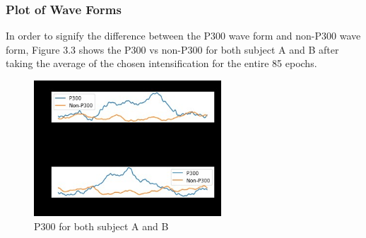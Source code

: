 \subsubsection{Plot of Wave Forms}
In order to signify the difference between the P300 wave form and non-P300 wave form, Figure 3.3 shows the P300 vs non-P300  for both subject A and B after taking the average of the chosen intensification for the entire 85 epochs.
\begin{figure}
    \centering
    \includegraphics[width=70mm]{images/A-B-P300-plot.jpg}
    \caption{P300 for both subject A and B}
    \label{fig:my_label}
\end{figure}
